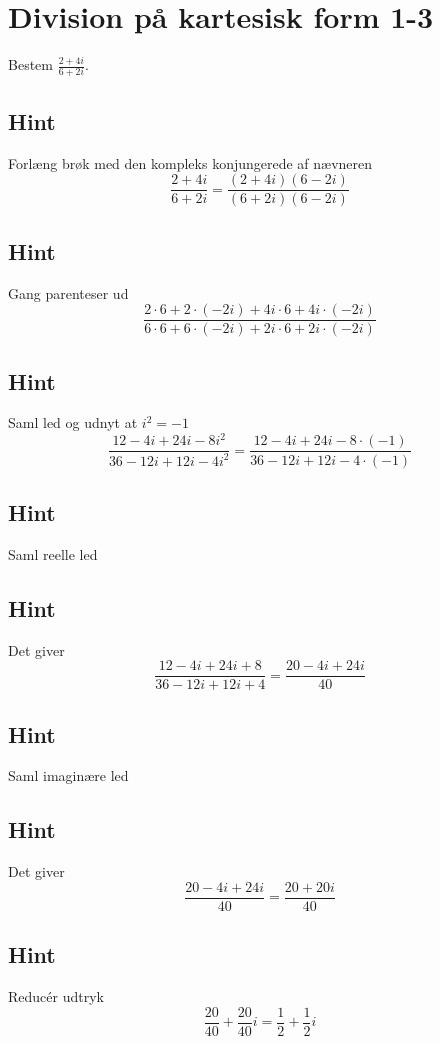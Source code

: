 \documentclass{article}
\newenvironment{exercise}[1]{\newpage\section{#1}}{}
\newcommand{\answerbox}[1]{\fbox{$#1$}}
\newcommand{\hint}{\subsection*{Hint}}
\begin{document}
\begin{exercise}{Division på kartesisk form 1-3}
	
	Bestem $\frac{2+4i}{6+2i}$.
	
	\answerbox{\frac{1}{2} + \frac{1}{2}i}
	
	
	\hint 
	
	Forlæng brøk med den kompleks konjungerede af nævneren
	\[
	\frac{2+4i}{6+2i} = \frac{(2+4i)(6-2i)}{(6+2i)(6-2i)} 
	\]
	
	\hint
	
	Gang parenteser ud
	\[
	 \frac{2 \cdot 6 + 2 \cdot (-2i) + 4i \cdot 6 + 4i \cdot (-2i)}{6 \cdot 6 + 6 \cdot (-2i) + 2i \cdot 6 + 2i \cdot (-2i)}
	\]
	
	\hint 
	
	Saml led og udnyt at $i^2 = -1$
	\[
	\frac{12 - 4i + 24i -8i^2}{36 -12i + 12i - 4i^2} = \frac{12 - 4i + 24i -8 \cdot (-1)}{36 -12i + 12i - 4 \cdot (-1)} 
	\]
	
	\hint
	
	Saml reelle led
	
	\hint
	
	Det giver
	\[
	\frac{12 - 4i + 24i +8}{36 -12i + 12i + 4} = \frac{20-4i +24i}{40}
	\]
	
	\hint
	
	Saml imaginære led
	
	
	\hint
	
	Det giver 
	\[
	 \frac{20 -4i +24i}{40}  = \frac{20 + 20i}{40}
	\]
	
	\hint
	
	Reducér udtryk
	\[
	\frac{20}{40} + \frac{20}{40}i  = \frac{1}{2} + \frac{1}{2}i
	\]
	
\end{exercise}

\newpage
\end{document}
